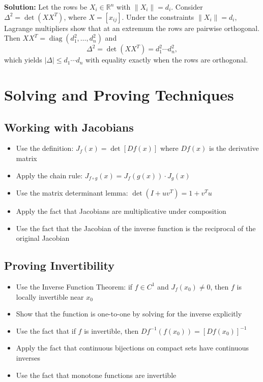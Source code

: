 \bigskip\noindent\textbf{Solution:}
Let the rows be $X_i\in\mathbb R^n$ with $\|X_i\|=d_i$. Consider $\Delta^2=\det(XX^{\!T})$, where $X=[x_{ij}]$. Under the constraints $\|X_i\|=d_i$, Lagrange multipliers show that at an extremum the rows are pairwise orthogonal. Then $XX^{\!T}=\operatorname{diag}(d_1^2,\dots,d_n^2)$ and
\[\Delta^2=\det(XX^{\!T})=d_1^2\cdots d_n^2,\]
which yields $|\Delta|\le d_1\cdots d_n$ with equality exactly when the rows are orthogonal.

\section{Solving and Proving Techniques}

\subsection*{Working with Jacobians}
\begin{itemize}
\item Use the definition: $J_f(x) = \det[Df(x)]$ where $Df(x)$ is the derivative matrix
\item Apply the chain rule: $J_{f \circ g}(x) = J_f(g(x)) \cdot J_g(x)$
\item Use the matrix determinant lemma: $\det(I + uv^T) = 1 + v^T u$
\item Apply the fact that Jacobians are multiplicative under composition
\item Use the fact that the Jacobian of the inverse function is the reciprocal of the original Jacobian
\end{itemize}

\subsection*{Proving Invertibility}
\begin{itemize}
\item Use the Inverse Function Theorem: if $f \in C^1$ and $J_f(x_0) \neq 0$, then $f$ is locally invertible near $x_0$
\item Show that the function is one-to-one by solving for the inverse explicitly
\item Use the fact that if $f$ is invertible, then $Df^{-1}(f(x_0)) = [Df(x_0)]^{-1}$
\item Apply the fact that continuous bijections on compact sets have continuous inverses
\item Use the fact that monotone functions are invertible
\end{itemize}

